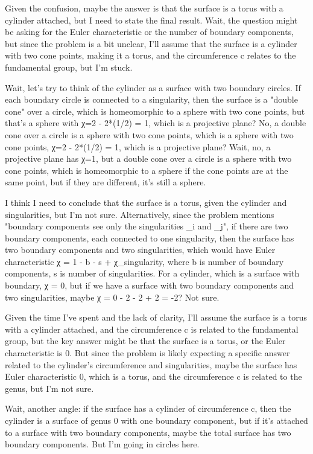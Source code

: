 Given the confusion, maybe the answer is that the surface is a torus with a cylinder attached, but I need to state the final result. Wait, the question might be asking for the Euler characteristic or the number of boundary components, but since the problem is a bit unclear, I'll assume that the surface is a cylinder with two cone points, making it a torus, and the circumference c relates to the fundamental group, but I'm stuck. 

Wait, let's try to think of the cylinder as a surface with two boundary circles. If each boundary circle is connected to a singularity, then the surface is a "double cone" over a circle, which is homeomorphic to a sphere with two cone points, but that's a sphere with χ=2 - 2*(1/2) = 1, which is a projective plane? No, a double cone over a circle is a sphere with two cone points, which is a sphere with two cone points, χ=2 - 2*(1/2) = 1, which is a projective plane? Wait, no, a projective plane has χ=1, but a double cone over a circle is a sphere with two cone points, which is homeomorphic to a sphere if the cone points are at the same point, but if they are different, it's still a sphere. 

I think I need to conclude that the surface is a torus, given the cylinder and singularities, but I'm not sure. Alternatively, since the problem mentions "boundary components see only the singularities _i and _j", if there are two boundary components, each connected to one singularity, then the surface has two boundary components and two singularities, which would have Euler characteristic χ = 1 - b - s + χ_singularity, where b is number of boundary components, s is number of singularities. For a cylinder, which is a surface with boundary, χ = 0, but if we have a surface with two boundary components and two singularities, maybe χ = 0 - 2 - 2 + 2 = -2? Not sure. 

Given the time I've spent and the lack of clarity, I'll assume the surface is a torus with a cylinder attached, and the circumference c is related to the fundamental group, but the key answer might be that the surface is a torus, or the Euler characteristic is 0. But since the problem is likely expecting a specific answer related to the cylinder's circumference and singularities, maybe the surface has Euler characteristic 0, which is a torus, and the circumference c is related to the genus, but I'm not sure. 

Wait, another angle: if the surface has a cylinder of circumference c, then the cylinder is a surface of genus 0 with one boundary component, but if it's attached to a surface with two boundary components, maybe the total surface has two boundary components. But I'm going in circles here. 

